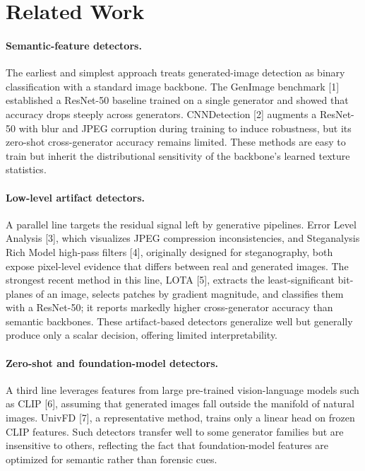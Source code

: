 \documentclass[11pt,a4paper]{article}
\begin{document}
\section{Related Work}

\paragraph{Semantic-feature detectors.}
The earliest and simplest approach treats generated-image detection as binary classification with a standard image backbone. The GenImage benchmark [1] established a ResNet-50 baseline trained on a single generator and showed that accuracy drops steeply across generators. CNNDetection [2] augments a ResNet-50 with blur and JPEG corruption during training to induce robustness, but its zero-shot cross-generator accuracy remains limited. These methods are easy to train but inherit the distributional sensitivity of the backbone's learned texture statistics.

\paragraph{Low-level artifact detectors.}
A parallel line targets the residual signal left by generative pipelines. Error Level Analysis [3], which visualizes JPEG compression inconsistencies, and Steganalysis Rich Model high-pass filters [4], originally designed for steganography, both expose pixel-level evidence that differs between real and generated images. The strongest recent method in this line, LOTA [5], extracts the least-significant bit-planes of an image, selects patches by gradient magnitude, and classifies them with a ResNet-50; it reports markedly higher cross-generator accuracy than semantic backbones. These artifact-based detectors generalize well but generally produce only a scalar decision, offering limited interpretability.

\paragraph{Zero-shot and foundation-model detectors.}
A third line leverages features from large pre-trained vision-language models such as CLIP [6], assuming that generated images fall outside the manifold of natural images. UnivFD [7], a representative method, trains only a linear head on frozen CLIP features. Such detectors transfer well to some generator families but are insensitive to others, reflecting the fact that foundation-model features are optimized for semantic rather than forensic cues.
\end{document}
